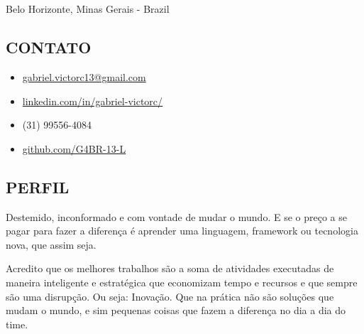 \documentclass[a4paper]{article}
\begin{document}
\begin{multicols}{2}



  {\fontsize{40pt}{46pt}}\\
  \\
  \normalsize{{\Large{}} Belo Horizonte, Minas Gerais - Brazil}
  

  \begin{framed}
    \section{CONTATO}
    \begin{itemize}[itemsep=1ex]
      \item {\Large{}} \href{mailto:gabriel.victorc13@gmail.com}{gabriel.victorc13@gmail.com}
      \item {\Large{}} \href{https://linkedin.com/in/gabriel-victorc/}{linkedin.com/in/gabriel-victorc/}
      \item {\Large{}} (31) 99556-4084
      \item {\Large{}} \href{https://github.com/G4BR-13-L}{github.com/G4BR-13-L}
    \end{itemize}
  \end{framed}

  \begin{framed}
    \section{PERFIL}

    Destemido, inconformado e com vontade de mudar o mundo. E se o preço a se pagar para fazer a diferença é aprender uma linguagem, framework ou tecnologia nova, que assim seja.

    Acredito que os melhores trabalhos são a soma de atividades executadas de maneira inteligente e estratégica que economizam tempo e recursos e que sempre são uma disrupção. Ou seja: Inovação. Que na prática não são soluções que mudam o mundo, e sim pequenas coisas que fazem a diferença no dia a dia do time.
  \end{framed}


\end{multicols}
\end{document}
